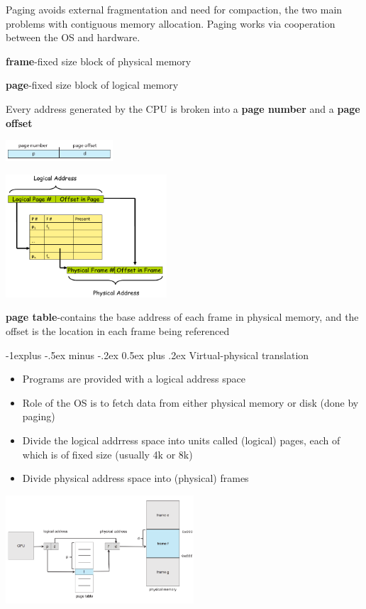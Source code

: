 \documentclass[8pt,landscape]{article}
\makeatletter
\renewcommand{\subsection}{\@startsection{subsection}{2}{0mm}%
                                {-1explus -.5ex minus -.2ex}%
                                {0.5ex plus .2ex}%
                                {\normalfont\scriptsize\bfseries}}
\makeatother
\begin{document}
\begin{multicols}{3}
\begin{tiny}
	Paging avoids external fragmentation and need for compaction, the two main problems with
	contiguous memory allocation. Paging works via cooperation between the OS and hardware.

	\textbf{frame}-fixed size block of physical memory
	
	\textbf{page}-fixed size block of logical memory

	Every address generated by the CPU is broken into a \textbf{page number} and a 
	\textbf{page offset}
	
	\begingroup
		\centering
		\includegraphics[width=4cm]{page.png}
	\endgroup
	
	\begingroup
		\centering
		\includegraphics[width=6cm]{pageTable.png}
	\endgroup

	\textbf{page table}-contains the base address of each frame in physical memory, and 
	the offset is the location in each frame being referenced
	
	\subsection{Virtual-physical translation}
	
	\begin{itemize}[noitemsep]
	   \item Programs are provided with a logical address space
	   \item Role of the OS is to fetch data from either physical memory or disk (done by paging)
	   \item Divide the logical addrress space into units called (logical) pages, each of which 
		   is of fixed size (usually 4k or 8k)
	   \item Divide physical address space into (physical) frames
	\end{itemize}
	
	\begingroup
		\centering
		\includegraphics[width=7cm]{pageHW.png}
	\endgroup


\end{tiny}
\end{multicols}
\end{document}
